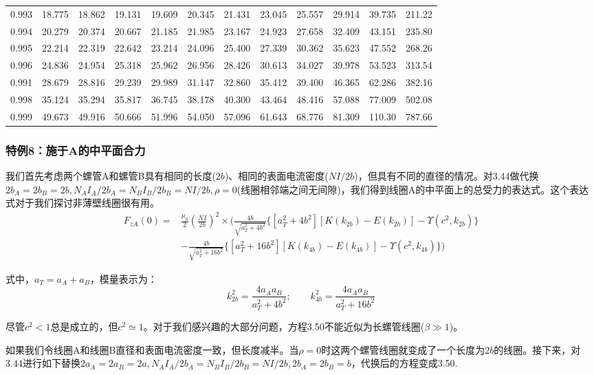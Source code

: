 \begin{table}[htbp]
\begin{tabular}{|l||l|l|l|l|l|l|l|l|l|l|l|}
		0.993 & 18.775 & 18.862 & 19.131 & 19.609 & 20.345 & 21.431 & 23.045 & 25.557 & 29.914 & 39.735 & 211.22 \\
		0.994 & 20.279 & 20.374 & 20.667 & 21.185 & 21.985 & 23.167 & 24.923 & 27.658 & 32.409 & 43.151 & 235.80 \\
		0.995 & 22.214 & 22.319 & 22.642 & 23.214 & 24.096 & 25.400 & 27.339 & 30.362 & 35.623 & 47.552 & 268.26 \\
		0.996 & 24.836 & 24.954 & 25.318 & 25.962 & 26.956 & 28.426 & 30.613 & 34.027 & 39.978 & 53.523 & 313.54 \\
		0.991 & 28.679 & 28.816 & 29.239 & 29.989 & 31.147 & 32.860 & 35.412 & 39.400 & 46.365 & 62.286 & 382.16 \\
		0.998 & 35.124 & 35.294 & 35.817 & 36.745 & 38.178 & 40.300 & 43.464 & 48.416 & 57.088 & 77.009 & 502.08 \\ 
		0.999 & 49.673 & 49.916 & 50.666 & 51.996 & 54.050 & 57.096 & 61.643 & 68.776 & 81.309 & 110.30 & 787.66 \\ \hline
	\end{tabular}
\end{table}

\subsubsection{特例8：施于A的中平面合力}
我们首先考虑两个螺管A和螺管B具有相同的长度($2b$)、相同的表面电流密度($NI/2b$)，但具有不同的直径的情况。对3.44做代换$2b_A = 2b_B = 2b, N_A I_A/2b_A = N_B I_B/2b_B = N I/2b,\rho=0$(线圈相邻端之间无间隙)，我们得到线圈A的中平面上的总受力的表达式。这个表达式对于我们探讨非薄壁线圈很有用。
\begin{equation}
\begin{split}
F_{zA}(0)=&\frac{\mu_0}{2}(\frac{NI}{2b})^2\times\bigg(\frac{4b}{\sqrt{a_T^2+4b^2}} \{[a_T^2+4b^2][K(k_{2b})-E(k_{2b})]-\Upsilon(c^2,k_{2b}) \}\\
&-\frac{4b}{\sqrt{a_T^2+16b^2}} \{[a_T^2+16b^2][K(k_{4b})-E(k_{4b})]-\Upsilon(c^2,k_{4b}) \}\bigg)
\end{split}
\end{equation}

式中，$a_T=a_A+a_B$，模量表示为：
$$k_{2b}^2=\frac{4a_A a_B}{a_T^2+4b^2} ; \qquad k_{4b}^2=\frac{4a_A a_B}{a_T^2+16b^2} $$

尽管$c^2<1$总是成立的，但$c^2\simeq 1$。对于我们感兴趣的大部分问题，方程3.50不能近似为长螺管线圈($\beta\gg 1$)。

如果我们令线圈A和线圈B直径和表面电流密度一致，但长度减半。当$\rho=0$时这两个螺管线圈就变成了一个长度为$2b$的线圈。接下来，对3.44进行如下替换$2a_A=2a_B=
2a, N_A I_A/2b_A = N_B I_B/2b_B = NI/2b,2b_A = 2b_B = b$，代换后的方程变成3.50.

